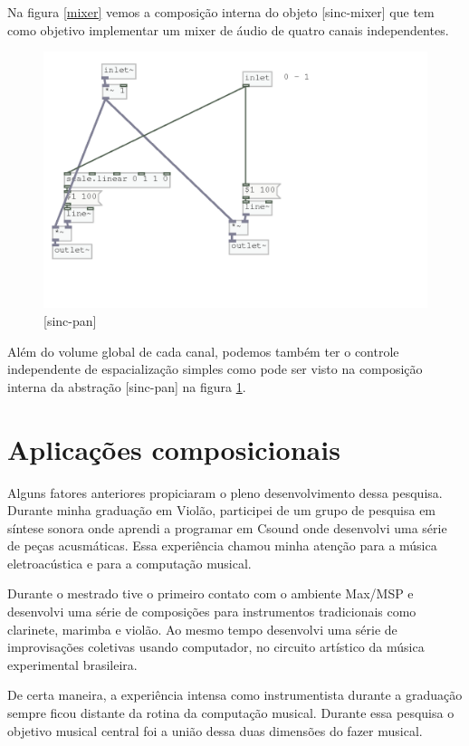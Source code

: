 \documentclass[draft]{ppgmus}
\begin{document}
Na figura \ref{mixer} vemos a composição interna do objeto
[sinc-mixer] que tem como objetivo implementar um mixer
de áudio de quatro canais independentes.

\begin{figure}
\includegraphics[scale=.6]{pan}
\caption{[sinc-pan]}
\label{pan}
\end{figure}

Além do volume global de cada canal, podemos também ter o controle
independente de espacialização simples como pode ser visto
na composição interna da abstração [sinc-pan] na figura \ref{pan}.

\chapter{Aplicações composicionais}
\label{composicao}

Alguns fatores anteriores propiciaram o pleno desenvolvimento
dessa pesquisa. Durante minha graduação em Violão, participei
de um grupo de pesquisa em síntese sonora onde aprendi a programar
em Csound onde desenvolvi uma série de peças acusmáticas. 
Essa experiência chamou minha atenção para a música
eletroacústica e para a computação musical. 

Durante o mestrado tive o primeiro contato com o ambiente
Max/MSP e desenvolvi uma série de composições para instrumentos
tradicionais como clarinete, marimba e violão. Ao mesmo tempo
desenvolvi uma série de improvisações coletivas usando computador,
no circuito artístico da música experimental brasileira.

De certa maneira, a experiência intensa como instrumentista
durante a graduação sempre ficou distante da rotina da
computação musical. Durante essa pesquisa o objetivo musical central 
foi a união dessa duas dimensões do fazer musical.
\end{document}
